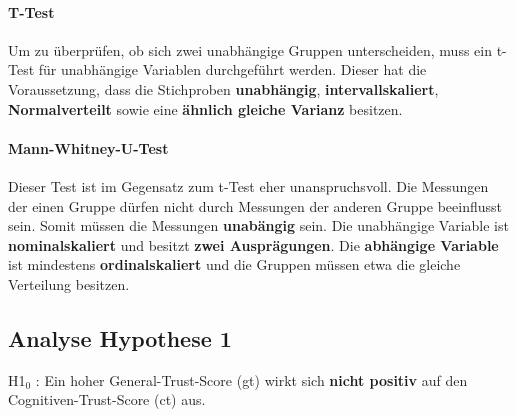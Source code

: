\documentclass[a4paper,11pt]{article}%
\renewcommand{\\}{\vspace*{0.5\baselineskip} \newline}
\begin{document}
\paragraph{T-Test}
Um zu überprüfen, ob sich zwei unabhängige Gruppen unterscheiden, muss ein t-Test für unabhängige Variablen durchgeführt werden.
Dieser hat die Voraussetzung, dass die Stichproben \textbf{unabhängig}, \textbf{intervallskaliert}, \textbf{Normalverteilt} sowie eine \textbf{ähnlich gleiche Varianz} besitzen.

\paragraph{Mann-Whitney-U-Test}
Dieser Test ist im Gegensatz zum t-Test eher unanspruchsvoll. Die Messungen der einen Gruppe dürfen nicht durch Messungen der anderen Gruppe beeinflusst sein. Somit müssen die Messungen \textbf{unabängig} sein. Die unabhängige Variable ist \textbf{nominalskaliert} und besitzt \textbf{zwei Ausprägungen}. Die \textbf{abhängige Variable} ist mindestens \textbf{ordinalskaliert}  und die Gruppen müssen etwa die gleiche Verteilung besitzen. \citep{eid2017statistik}

\newpage
	\subsection{Analyse Hypothese 1}
H1$_{0}$ : Ein hoher General-Trust-Score (\ac{gt}) wirkt sich \textbf{nicht positiv} auf den Cognitiven-Trust-Score (\ac{ct}) aus.


\end{document}
